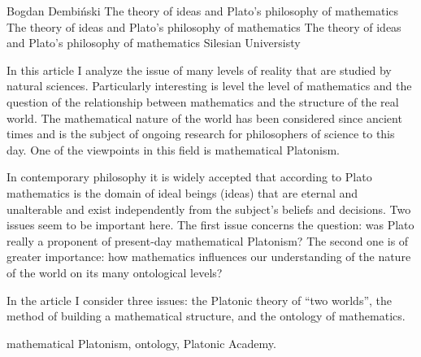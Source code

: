 \begin{artengenv}{Bogdan Dembiński}
	{The theory of ideas and Plato’s philosophy of mathematics}
	{The theory of ideas and Plato’s philosophy of mathematics}
	{The theory of ideas and Plato’s philosophy of mathematics}
	{Silesian Universisty}
	{In this article I analyze the issue of many levels of reality that are studied by natural sciences. Particularly
		interesting is level the level of mathematics and the question of the relationship between mathematics and the
		structure of the real world. The mathematical nature of the world has been considered since ancient times and is
		the subject of ongoing research for philosophers of science to this day. One of the viewpoints in this field is
		mathematical Platonism.
		
		In contemporary philosophy it is widely accepted that according to Plato mathematics is the domain of ideal beings
		(ideas) that are eternal and unalterable and exist independently from the subject's beliefs and decisions. Two issues
		seem to be important here. The first issue concerns the question: was Plato really a proponent of present-day
		mathematical Platonism? The second one is of greater importance: how mathematics influences our understanding of the
		nature of the world on its many ontological levels?
		
		In the article I consider three issues: the Platonic theory of ``two worlds'', the method of
		building a mathematical structure, and the ontology of mathematics.}
	{mathematical Platonism, ontology, Platonic Academy.}








\end{artengenv}
